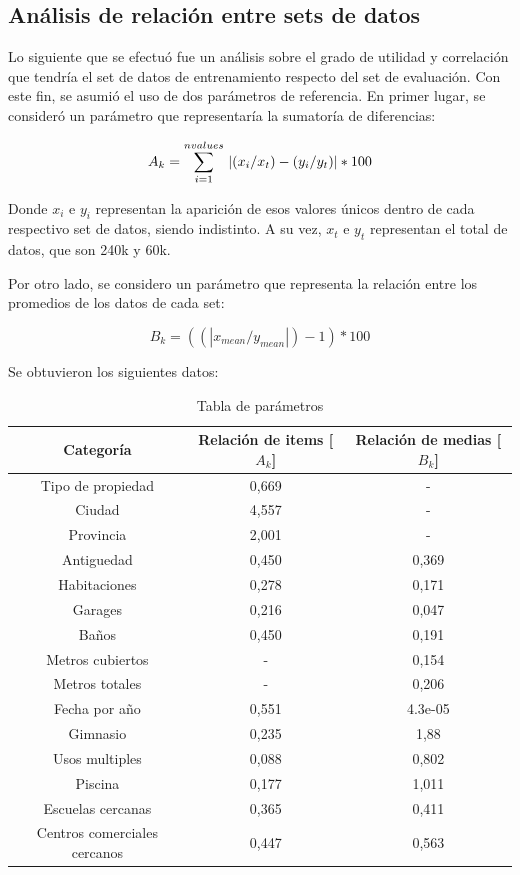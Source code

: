 \documentclass[titlepage,a4paper,11pt]{article}
\begin{document}
\subsection{Análisis de relación entre sets de datos}
Lo siguiente que se efectuó fue un análisis sobre el grado de utilidad y correlación que tendría el set de datos de entrenamiento respecto del set de evaluación. Con este fin, se asumió el uso de dos parámetros de referencia. En primer lugar, se consideró un parámetro que representaría la sumatoría de diferencias:

\begin{equation}
A_{k} = \sum_{i=1}^{n values}\\ \left|(x_{i}/x_{t})-(y_{i}/y_{t})\right| * 100
\end{equation}

Donde $x_{i}$ e $y_{i}$ representan la aparición de esos valores únicos dentro de cada respectivo set de datos, siendo indistinto. A su vez, $x_{t}$ e $y_{t}$ representan el total de datos, que son 240k y 60k.

Por otro lado, se considero un parámetro que representa la relación entre los promedios de los datos de cada set:

\begin{equation}
B_{k} = ((\left|x_{mean}/y_{mean}\right|) - 1) * 100
\end{equation}

Se obtuvieron los siguientes datos:

\begin{table}[h]
	\begin{center}
		\begin{tabular}{|c|c|c|}
			\hline
	Categoría & Relación de items [$A_{k}$] & Relación de medias [$B_{k}$] \\ \hline
	Tipo de propiedad & 0,669 & -\\ \hline
	Ciudad & 4,557 & -\\ \hline
	Provincia & 2,001 & -\\ \hline
	Antiguedad & 0,450 & 0,369\\ \hline
	Habitaciones & 0,278 & 0,171 \\ \hline
	Garages & 0,216 & 0,047 \\ \hline
	Baños & 0,450 & 0,191 \\ \hline
	Metros cubiertos & - & 0,154 \\ \hline
	Metros totales & - & 0,206 \\ \hline
	Fecha por año & 0,551 &  4.3e-05 \\ \hline
	Gimnasio & 0,235 & 1,88 \\ \hline
	Usos multiples & 0,088 & 0,802 \\ \hline
	Piscina & 0,177 & 1,011 \\ \hline
	Escuelas cercanas & 0,365 & 0,411 \\ \hline
	Centros comerciales cercanos & 0,447 & 0,563 \\ \hline
\end{tabular}
\caption{Tabla de parámetros}
\label{tabla:sencilla}
\end{center}
\end{table}
\end{document}
